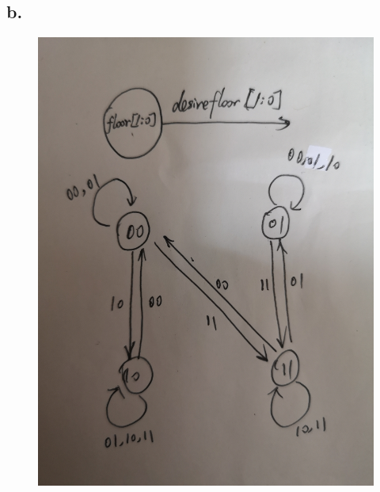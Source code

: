\documentclass[11pt,a4paper]{article}
\begin{document}
	\subsection*{b.}
	\begin{figure}[H]
		\centering
		\includegraphics[width=1\linewidth]{11_b.jpg}
		\label{11_b}
	\end{figure}
	
	
	

	
\end{document}
